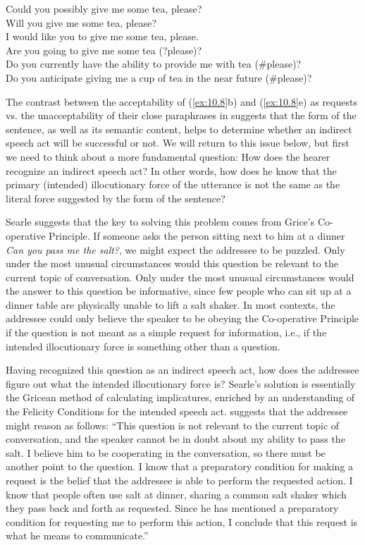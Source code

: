 \ea \label{ex:10.10}
\ea Could you possibly give me some tea, please?\\
\ex Will you give me some tea, please?\\
\ex I would like you to give me some tea, please.\\
\ex Are you going to give me some tea (?please)?\\
\ex Do you currently have the ability to provide me with tea (\#please)?\\
\ex Do you anticipate giving me a cup of tea in the near future (\#please)?
\z \z


The contrast between the acceptability of (\ref{ex:10.8}b) and (\ref{ex:10.8}e) as requests vs. the unacceptability of their close paraphrases in  suggests that the form of the sentence, as well as its semantic content, helps to determine whether an indirect speech act will be successful or not. We will return to this issue below, but first we need to think about a more fundamental question: How does the hearer recognize an indirect speech act? In other words, how does he know that the primary (intended) illocutionary force of the utterance is not the same as the literal force suggested by the form of the sentence?



Searle suggests that the key to solving this problem comes from Grice’s Co-operative Principle. If someone asks the person sitting next to him at a dinner \textit{Can you pass me the salt?}, we might expect the addressee to be puzzled. Only under the most unusual circumstances would this question be relevant to the current topic of conversation. Only under the most unusual circumstances would the answer to this question be informative, since few people who can sit up at a dinner table are physically unable to lift a salt shaker. In most contexts, the addressee could only believe the speaker to be obeying the Co-operative Principle if the question is not meant as a simple request for information, i.e., if the intended illocutionary force is something other than a question.



Having recognized this question as an indirect speech act, how does the addressee figure out what the intended illocutionary force is? Searle’s solution is essentially the Gricean method of calculating implicatures, enriched by an understanding of the Felicity Conditions for the intended speech act. \citet{Searle1975} suggests that the addressee might reason as follows: “This question is not relevant to the current topic of conversation, and the speaker cannot be in doubt about my ability to pass the salt. I believe him to be cooperating in the conversation, so there must be another point to the question. I know that a preparatory condition for making a request is the belief that the addressee is able to perform the requested action. I know that people often use salt at dinner, sharing a common salt shaker which they pass back and forth as requested. Since he has mentioned a preparatory condition for requesting me to perform this action, I conclude that this request is what he means to communicate.”



